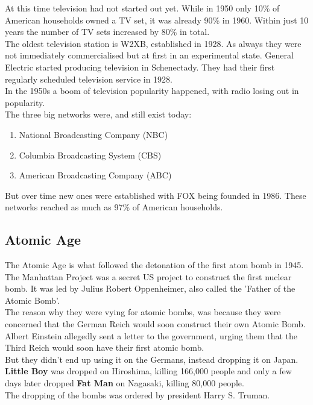 \documentclass{article}
\begin{document}
	At this time television had not started out yet. While in 1950 only 10\% of American households owned a TV set, it was already 90\% in 1960. Within just 10 years the number of TV sets increased by 80\% in total. \\
	The oldest television station is W2XB, established in 1928. As always they were not immediately commercialised but at first in an experimental state. General Electric started producing television in Schenectady. They had their first regularly scheduled television service in 1928. \\
	In the 1950s a boom of television popularity happened, with radio losing out in popularity. \\
	The three big networks were, and still exist today: 
	\begin{enumerate}
		\item{National Broadcasting Company (NBC)}
		\item{Columbia Broadcasting System (CBS)}
		\item{American Broadcasting Company (ABC)}
	\end{enumerate}
	But over time new ones were established with FOX being founded in 1986. These networks reached as much as 97\% of American households. \\
	\subsection{Atomic Age}
	The Atomic Age is what followed the detonation of the first atom bomb in 1945. \\
	The Manhattan Project was a secret US project to construct the first nuclear bomb. It was led by Julius Robert Oppenheimer, also called the 'Father of the Atomic Bomb'. \\
	The reason why they were vying for atomic bombs, was because they were concerned that the German Reich would soon construct their own Atomic Bomb. Albert Einstein allegedly sent a letter to the government, urging them that the Third Reich would soon have their first atomic bomb. \\
	But they didn't end up using it on the Germans, instead dropping it on Japan. \textbf{Little Boy} was dropped on Hiroshima, killing 166,000 people and only a few days later dropped \textbf{Fat Man} on Nagasaki, killing 80,000 people. \\
	The dropping of the bombs was ordered by president Harry S. Truman. \\
\end{document}
